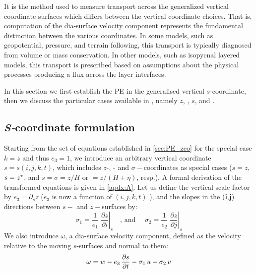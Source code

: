 \documentclass[../main/NEMO_manual]{subfiles}
\begin{document}
It is the method used to measure transport across the generalized vertical coordinate surfaces which differs between
the vertical coordinate choices.
That is, computation of the dia-surface velocity component represents the fundamental distinction between
the various coordinates.
In some models, such as geopotential, pressure, and terrain following, this transport is typically diagnosed from
volume or mass conservation.
In other models, such as isopycnal layered models, this transport is prescribed based on assumptions about
the physical processes producing a flux across the layer interfaces. 


In this section we first establish the PE in the generalised vertical $s$-coordinate,
then we discuss the particular cases available in \NEMO, namely $z$, \zstar, $s$, and \ztilde.  

\subsection{\textit{S-}coordinate formulation}

Starting from the set of equations established in \autoref{sec:PE_zco} for the special case $k=z$ and thus $e_3=1$,
we introduce an arbitrary vertical coordinate $s=s(i,j,k,t)$,
which includes $z$-, \zstar- and $\sigma-$coordinates as special cases
($s=z$, $s=z^\star$, and $s=\sigma=z/H$ or $=z/\left(H+\eta \right)$, resp.).
A formal derivation of the transformed equations is given in \autoref{apdx:A}.
Let us define the vertical scale factor by $e_3=\partial_s z$  ($e_3$ is now a function of $(i,j,k,t)$ ),
and the slopes in the (\textbf{i},\textbf{j}) directions between $s-$ and $z-$surfaces by:
\begin{equation}
  \label{eq:PE_sco_slope}
  \sigma_1 =\frac{1}{e_1 }\;\left. {\frac{\partial z}{\partial i}} \right|_s
  \quad \text{, and } \quad
  \sigma_2 =\frac{1}{e_2 }\;\left. {\frac{\partial z}{\partial j}} \right|_s
\end{equation}
We also introduce  $\omega $, a dia-surface velocity component, defined as the velocity 
relative to the moving $s$-surfaces and normal to them:
\[
  \omega  = w - e_3 \, \frac{\partial s}{\partial t} - \sigma_1 \,u - \sigma_2 \,v    \\
\]
\end{document}
